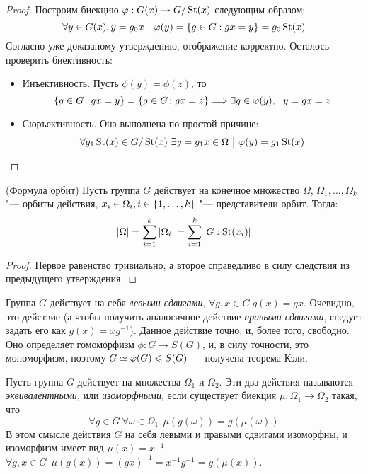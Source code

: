 \begin{proof}
	Построим биекцию $\varphi: G(x) \to G / \operatorname{St}(x)$ следующим образом: 
	\[
		\forall y \hm\in G(x), y = g_0x \quad \phi(y) = \{g \in G: gx = y\} \hm= g_0\St(x)
	\]
	Согласно уже доказаному утверждению, отображение корректно. Осталось проверить биективность:
	\begin{itemize}
		\item Инъективность. Пусть $\phi(y) = \phi(z)$, то
		\[
			\{g \in G \colon gx = y\} = \{g \in G \colon gx = z\} \Longrightarrow \exists g \in \varphi(y),\ \ y = gx = z
		\]
		
		\item Сюръективность. Она выполнена по простой причине:
		\[
			\forall g_1 \operatorname{St}(x) \in G / \operatorname{St}(x)\ \exists y = g_1 x \in \Omega \ \big|\  \varphi(y) = g_1 \operatorname{St}(x)
		\]
	\end{itemize}
\end{proof}

\begin{theorem} (Формула орбит)
	Пусть группа $G$ действует на конечное множество $\Omega$, $\Omega_1, \dotsc, \Omega_k$ "--- орбиты действия, $x_i \in \Omega_i, i \hm\in \{1, \dotsc, k\}$ "--- представители орбит. Тогда:
	\[|\Omega| = \sum\limits_{i = 1}^k|\Omega_i| = \sum\limits_{i = 1}^k|G : \operatorname{St}(x_i)|\]
\end{theorem}

\begin{proof}
	Первое равенство тривиально, а второе справедливо в силу следствия из предыдущего утверждения.
\end{proof}

\begin{example}
	Группа $G$ действует на себя \textit{левыми сдвигами}, $\forall g, x \in G\ g(x) = gx$. Очевидно, это действие (а чтобы получить аналогичное действие \textit{правыми сдвигами}, следует задать его как $g(x) = xg^{-1}$). Данное действие точно, и, более того, свободно. Оно определяет гомоморфизм $\phi \colon G \to S(G)$, и, в силу точности, это мономорфизм, поэтому $G \simeq \phi(G) \hm\le S(G)$ --- получена теорема Кэли.
\end{example}

\begin{note}
	Пусть группа $G$ действует на множества $\Omega_1$ и $\Omega_2$. Эти два действия называются \textit{эквивалентными}, или \textit{изоморфными}, если существует биекция $\mu \colon \Omega_1 \to \Omega_2$ такая, что 
	\[
		\forall g \in G\ \forall \omega \in \Omega_1\ \ \mu(g(\omega)) = g(\mu(\omega))
	\]
	В этом смысле действия $G$ на себя левыми и правыми сдвигами изоморфны, и изоморфизм имеет вид $\mu(x) = x^{-1}$, $\forall g, x \in G\ \ \mu(g(x)) = (gx)^{-1} = x^{-1}g^{-1} = g(\mu(x))$.
\end{note}

